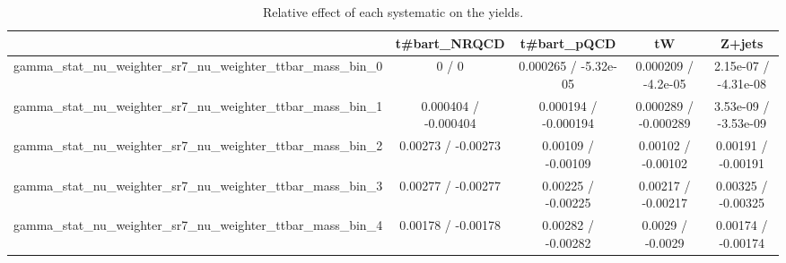 \documentclass[10pt]{article}
\begin{document}
\begin{table}[htbp]
\begin{center}
\begin{tabular}{|c|c|c|c|c|}
\hline 
      & t#bar{t}_{NRQCD}      & t#bar{t}_{pQCD}      & tW      & Z+jets \\ 
\hline 
  gamma_stat_nu_weighter_sr7_nu_weighter_ttbar_mass_bin_0 & 0 / 0 & 0.000265 / -5.32e-05 & 0.000209 / -4.2e-05 & 2.15e-07 / -4.31e-08 \\ 
  gamma_stat_nu_weighter_sr7_nu_weighter_ttbar_mass_bin_1 & 0.000404 / -0.000404 & 0.000194 / -0.000194 & 0.000289 / -0.000289 & 3.53e-09 / -3.53e-09 \\ 
  gamma_stat_nu_weighter_sr7_nu_weighter_ttbar_mass_bin_2 & 0.00273 / -0.00273 & 0.00109 / -0.00109 & 0.00102 / -0.00102 & 0.00191 / -0.00191 \\ 
  gamma_stat_nu_weighter_sr7_nu_weighter_ttbar_mass_bin_3 & 0.00277 / -0.00277 & 0.00225 / -0.00225 & 0.00217 / -0.00217 & 0.00325 / -0.00325 \\ 
  gamma_stat_nu_weighter_sr7_nu_weighter_ttbar_mass_bin_4 & 0.00178 / -0.00178 & 0.00282 / -0.00282 & 0.0029 / -0.0029 & 0.00174 / -0.00174 \\ 
\hline 
\end{tabular} 
\caption{Relative effect of each systematic on the yields.} 
\end{center} 
\end{table} 
\end{document}

